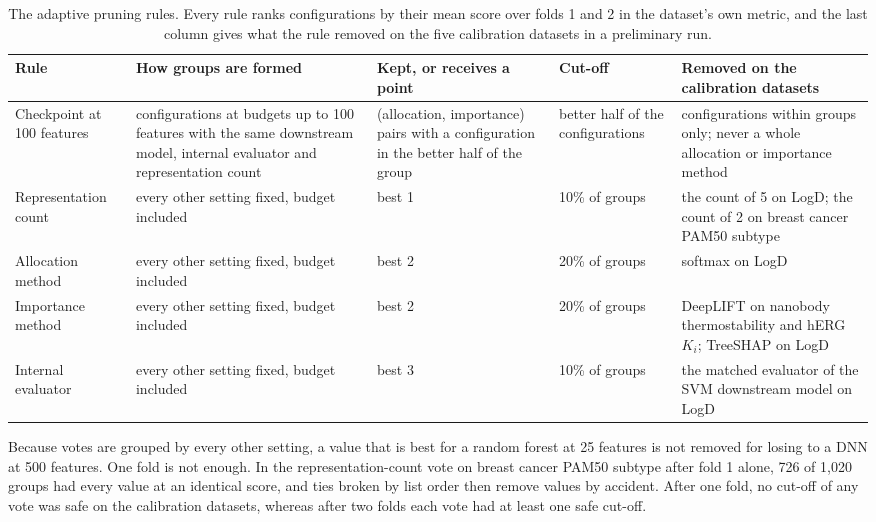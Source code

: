 \begin{table}[htbp]
\centering
\small
\begin{adjustbox}{max width=\textwidth,max totalheight=0.78\textheight}
\begin{tabular}{@{}P{2.2cm}P{3.4cm}P{2.8cm}P{1.6cm}P{3.6cm}@{}}
\toprule
Rule & How groups are formed & Kept, or receives a point & Cut-off & Removed on the calibration datasets \\
\midrule
Checkpoint at 100 features & configurations at budgets up to 100 features with the same downstream model, internal evaluator and representation count & (allocation, importance) pairs with a configuration in the better half of the group & better half of the configurations & configurations within groups only; never a whole allocation or importance method \\
\addlinespace
Representation count & every other setting fixed, budget included & best 1 & 10\% of groups & the count of 5 on LogD; the count of 2 on breast cancer PAM50 subtype \\
\addlinespace
Allocation method & every other setting fixed, budget included & best 2 & 20\% of groups & softmax on LogD \\
\addlinespace
Importance method & every other setting fixed, budget included & best 2 & 20\% of groups & DeepLIFT on nanobody thermostability and hERG $K_i$; TreeSHAP on LogD \\
\addlinespace
Internal evaluator & every other setting fixed, budget included & best 3 & 10\% of groups & the matched evaluator of the SVM downstream model on LogD \\
\bottomrule
\end{tabular}
\end{adjustbox}
\caption[The adaptive pruning rules.]{The adaptive pruning rules. Every rule ranks configurations by their mean score over folds 1 and 2 in the dataset's own metric, and the last column gives what the rule removed on the five calibration datasets in a preliminary run.}
\label{tab:pruning_rules}
\end{table}

Because votes are grouped by every other setting, a value that is best for a random forest at 25 features is not removed for losing to a DNN at 500 features. One fold is not enough. In the representation-count vote on breast cancer PAM50 subtype after fold 1 alone, 726 of 1,020 groups had every value at an identical score, and ties broken by list order then remove values by accident. After one fold, no cut-off of any vote was safe on the calibration datasets, whereas after two folds each vote had at least one safe cut-off.


